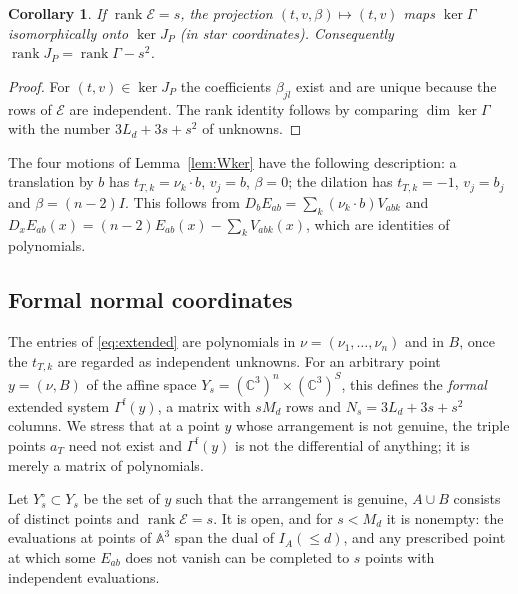\documentclass{amsart}
\newtheorem{corollary}[theorem]{Corollary}
\theoremstyle{definition}
\theoremstyle{remark}
\numberwithin{equation}{section}
\newcommand{\CC}{\mathbb{C}}
\newcommand{\A}{\mathbb{A}}
\DeclareMathOperator{\rank}{rank}
\begin{document}
\begin{corollary}\label{cor:extended}
If $\rank\mathcal E=s$, the projection $(t,v,\beta)\mapsto(t,v)$ maps $\ker\Gamma$
isomorphically onto $\ker J_P$ (in star coordinates). Consequently
$\rank J_P=\rank\Gamma-s^2$.
\end{corollary}

\begin{proof}
For $(t,v)\in\ker J_P$ the coefficients $\beta_{jl}$ exist and are unique because the
rows of $\mathcal E$ are independent. The rank identity follows by comparing
$\dim\ker\Gamma$ with the number $3L_d+3s+s^2$ of unknowns.
\end{proof}

The four motions of Lemma~\ref{lem:Wker} have the following description: a
translation by $b$ has $t_{T,k}=\nu_k\cdot b$, $v_j=b$, $\beta=0$; the dilation has
$t_{T,k}=-1$, $v_j=b_j$ and $\beta=(n-2)I$. This follows from
$D_bE_{ab}=\sum_k(\nu_k\cdot b)V_{abk}$ and
$D_xE_{ab}(x)=(n-2)E_{ab}(x)-\sum_kV_{abk}(x)$, which are identities of polynomials.

\subsection{Formal normal coordinates}\label{sec:formal}
The entries of \eqref{eq:extended} are polynomials in $\nu=(\nu_1,\dots,\nu_n)$ and
in $B$, once the $t_{T,k}$ are regarded as independent unknowns. For an arbitrary
point $y=(\nu,B)$ of the affine space $Y_s=(\CC^3)^n\times(\CC^3)^S$, this defines the
\emph{formal} extended system $\Gamma^{\mathrm{f}}(y)$, a matrix with $sM_d$ rows and
$N_s=3L_d+3s+s^2$ columns. We stress that at a point $y$ whose arrangement is not
genuine, the triple points $a_T$ need not exist and $\Gamma^{\mathrm f}(y)$ is not
the differential of anything; it is merely a matrix of polynomials.

Let $Y_s^\circ\subset Y_s$ be the set of $y$ such that the arrangement is genuine,
$A\cup B$ consists of distinct points and $\rank\mathcal E=s$. It is open, and for
$s<M_d$ it is nonempty: the evaluations at points of $\A^3$ span the dual of
$I_A(\le d)$, and any prescribed point at which some $E_{ab}$ does not vanish can be
completed to $s$ points with independent evaluations.
\end{document}
